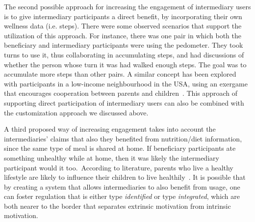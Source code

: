 The second possible approach for increasing the engagement of intermediary users is to give intermediary participants a direct benefit, by incorporating their own wellness data (i.e. steps). There were some observed scenarios that support the utilization of this approach. For instance, there was one pair in which both the beneficiary and intermediary participants were using the pedometer. They took turns to use it, thus collaborating in accumulating steps, and had discussions of whether the person whose turn it was had walked enough steps. The goal was to accumulate more steps than other pairs. A similar concept has been explored with participants in a low-income neighbourhood in the USA, using an exergame that encourages cooperation between parents and children~\citep{saksono2015spaceship}. This approach of supporting direct participation of intermediary users can also be combined with the customization approach we discussed above.

A third proposed way of increasing engagement takes into account the intermediaries' claims that also they benefited from nutrition/diet information, since the same type of meal is shared at home. If beneficiary participants ate something unhealthy while at home, then it was likely the intermediary participant would it too.~According to literature, parents who live a healthy lifestyle are likely to influence their children to live healthily~\citep{grimes2009toward}. It is possible that by creating a system that allows intermediaries to also benefit from usage, one can foster regulation that is either type \emph{identified} or type \emph{integrated}, which are both nearer to the border that separates extrinsic motivation from intrinsic motivation. 


